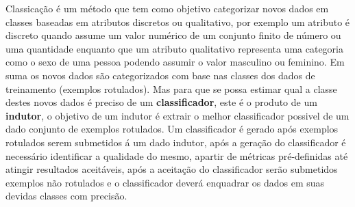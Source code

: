 Classicação é um método que tem como objetivo categorizar novos dados em classes baseadas em atributos discretos ou qualitativo,
por exemplo um atributo é discreto quando assume um valor numérico de um conjunto finito de número ou uma quantidade enquanto que um
atributo qualitativo representa uma categoria como o sexo de uma pessoa podendo assumir o valor masculino ou feminino.
Em suma os novos dados são categorizados com base nas classes dos dados de treinamento (exemplos rotulados). 
Mas para que se possa estimar qual a classe destes novos dados é preciso de um \textbf{classificador},
este é o produto de um \textbf{indutor}, o objetivo de um indutor é extrair o melhor classificador possivel de um dado 
conjunto de exemplos rotulados.
Um classificador é gerado após exemplos rotulados serem submetidos á um dado indutor, após a geração do classificador 
é necessário identificar a qualidade do mesmo, apartir de métricas pré-definidas até atingir resultados aceitáveis, após a aceitação do classificador 
serão submetidos exemplos não rotulados e o classificador deverá enquadrar os dados em suas devidas classes com precisão. 
\begin{figure}[htb!]
	\centering
\end{figure}  

